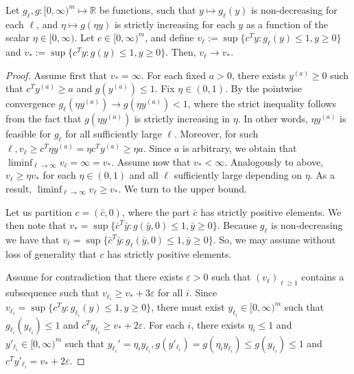\documentclass[10pt,a4paper]{amsart}
\begin{document}
\begin{proposition}\label{prop:1}
    Let $g_\ell, g: [0,\infty)^m\mapsto \mathbb{R}$ be functions, such that $y\mapsto g_\ell( y)$ is non-decreasing for each $\ell$, and $\eta\mapsto g(\eta y)$ is strictly increasing for each $y$ as a function of the scalar $\eta\in [0,\infty)$. Let $c\in[0,\infty)^m$, and define $v_\ell:=\sup \{c^Ty: g_\ell(y)\le 1, y\ge 0\}$ and $v_\ast := \sup \{c^Ty: g(y)\le 1, y\ge 0\}$. Then, $v_\ell\to v_\ast$.
\end{proposition}

\begin{proof}
    Assume first that $v_\ast=\infty$. For each fixed $a>0$, there exists $y^{(a)}\ge0$ such that $c^Ty^{(a)} \geq a$ and $g(y^{(a)})\leq 1$.
    Fix $\eta\in(0,1)$. By the pointwise convergence $g_\ell(\eta y^{(a)})\to g(\eta y^{(a)})<1$, where the strict inequality follows from the fact that $g(\eta y^{(a)})$ is strictly increasing in $\eta$. In other words, $\eta y^{(a)}$ is feasible for $g_\ell$ for all sufficiently large $\ell$. Moreover, for such $\ell, v_\ell\ge c^T \eta y^{(a)}=\eta c^Ty^{(a)}\ge \eta a$. Since $a$ is arbitrary, we obtain that $\liminf_{\ell\to\infty} v_\ell =\infty=v_\ast$.
    Assume now that $v_\ast<\infty$. Analogously to above, $v_\ell\ge \eta v_\ast$ for each $\eta\in(0,1)$ and all $\ell$ sufficiently large depending on $\eta$. As a result, $\liminf_{\ell \to\infty} v_\ell \ge v_\ast$. 
    We  turn to the upper bound. 

    Let us partition $c=(\bar{c},0)$, where the part $\bar{c}$ has strictly positive elements. We then note that $v_* = \sup\{\bar{c}^T \bar{y} : g(\bar{y},0) \leq 1, \bar{y} \geq 0\}$. Because $g_\ell$ is  non-decreasing 
    we have that 
$v_\ell = \sup\{\bar{c}^T \bar{y}: g_\ell(\bar{y},0) \leq 1, \bar{y}\geq 0\}.$ 
 So, we may assume without loss of generality that $c$ has strictly positive elements.
 
    Assume for contradiction that there exists $\varepsilon>0$ such that $(v_\ell)_{\ell\ge 1}$ contains a subsequence such that $v_{\ell_i} \ge v_\ast+3\varepsilon$ for all $i$. Since $v_{\ell_i}=\sup \{c^Ty: g_{\ell_i}(y)\le 1, y\ge 0\}$,  there must exist $y_{\ell_i}\in [0,\infty)^m$ such that $g_{\ell_i}(y_{\ell_i})\le 1$ and $c^T y_{\ell_i}\ge v_\ast+2\varepsilon$. For each $i$, there exists $\eta_i\leq 1$ and $y'_{\ell_i}\in[0,\infty)^m$ such that $y_{\ell_i}'=\eta_i y_{\ell_i},  g(y'_{\ell_i}) = g(\eta_i y_{\ell_i}) \le g(y_{\ell_i}) \le 1$ and $c^Ty'_{\ell_i}=v_\ast+2\varepsilon$. 



\end{proof}
\end{document}
